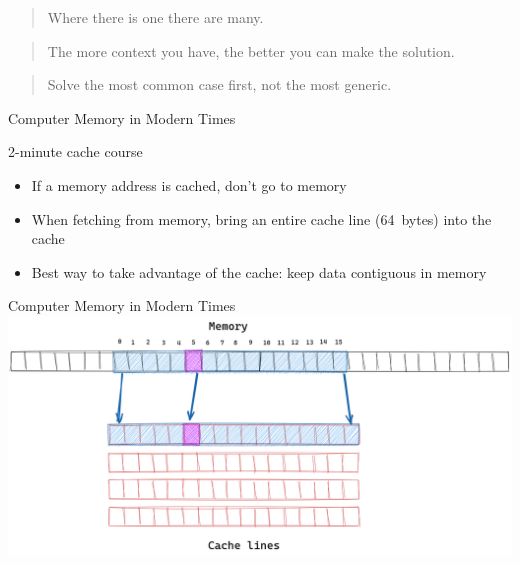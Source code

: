 \documentclass[10pt,xcolor=dvipsnames]{beamer}
\renewcommand\big[1]{
  \begin{center}
    \Large{#1}
  \end{center}
}
\begin{document}
\begin{frame}
  \begin{quote}
    Where there is one there are many.
  \end{quote}
\end{frame}

\begin{frame}
  \begin{quote}
    The more context you have, the better you can make the solution.
  \end{quote}
\end{frame}


\begin{frame}
  \begin{quote}
    Solve the most common case first, not the most generic.
  \end{quote}
\end{frame}

\begin{frame}{Computer Memory in Modern Times}
  \big{2-minute cache course}
  \begin{itemize}
    \item If a memory address is cached, don't go to memory
    \item When fetching from memory, bring an entire cache line (64~bytes) into the cache
    \item Best way to take advantage of the cache: keep data contiguous in memory
  \end{itemize}
\end{frame}

\begin{frame}{Computer Memory in Modern Times}
  \centering\includegraphics[scale=0.2]{cache-line-copy.png}
\end{frame}
\end{document}
